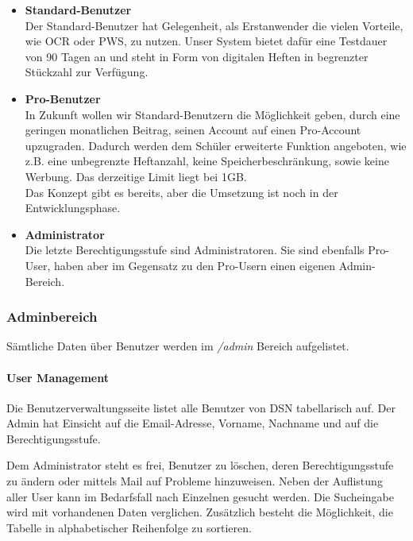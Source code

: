 \begin{itemize}
\item \textbf{Standard-Benutzer}\\ Der Standard-Benutzer hat Gelegenheit, als Erstanwender die vielen Vorteile, wie OCR oder PWS, zu nutzen. Unser System bietet dafür eine Testdauer von 90 Tagen an und steht in Form von digitalen Heften in begrenzter Stückzahl zur Verfügung.
\item \textbf{Pro-Benutzer}\\ In Zukunft wollen wir Standard-Benutzern die Möglichkeit geben, durch eine geringen monatlichen Beitrag, seinen Account auf einen Pro-Account upzugraden. Dadurch werden dem Schüler erweiterte Funktion angeboten, wie z.B. eine unbegrenzte Heftanzahl, keine Speicherbeschränkung, sowie keine Werbung. Das derzeitige Limit liegt bei 1GB.\\
Das Konzept gibt es bereits, aber die Umsetzung ist noch in der Entwicklungsphase.
\item \textbf{Administrator}\\ Die letzte Berechtigungsstufe sind Administratoren. Sie sind ebenfalls Pro-User, haben aber im Gegensatz zu den Pro-Usern einen eigenen Admin-Bereich.
\end{itemize}

\subsubsection{Adminbereich}
Sämtliche Daten über Benutzer werden im \textit{/admin} Bereich aufgelistet.
\paragraph{User Management}
Die Benutzerverwaltungsseite listet alle Benutzer von DSN tabellarisch auf. Der Admin hat Einsicht auf die Email-Adresse, Vorname, Nachname und auf die Berechtigungsstufe.

\newpage

Dem Administrator steht es frei, Benutzer zu löschen, deren Berechtigungsstufe zu ändern oder mittels Mail auf Probleme hinzuweisen. Neben der Auflistung aller User kann im Bedarfsfall nach Einzelnen gesucht werden. Die Sucheingabe wird mit vorhandenen Daten verglichen. Zusätzlich besteht die Möglichkeit, die Tabelle in alphabetischer Reihenfolge zu sortieren.


